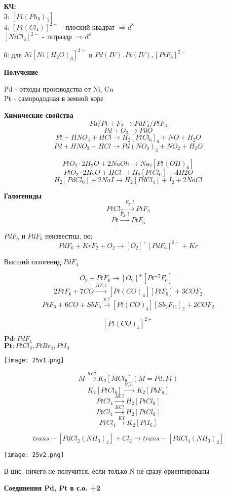 \textbf{КЧ:}\\
3: $[Pt(Ph_3)_3]$\\
4:  $[Pt(Cl_4)]^{2-}$ - плоский квадрат $\Rightarrow d^8$\\
$[NiCl_4]^{2-}$ - тетраэдр $\Rightarrow d^8$

6: для $Ni[Ni(H_2O)_6]^{2+}$ и $Pd(IV), Pt(IV), [PtF_6]^{2-}$

\textbf{Получение}

Pd - отходы производства от Ni, Cu\\
Pt - саморододная в земной коре

\textbf{Химические свойства}\\
$$Pd/Pt + F_2 \rightarrow PdF_4 / PtF_6$$
$$Pd + O_2 \rightarrow PdO$$
$$Pt + HNO_3 + HCl \rightarrow H_2[PtCl_6]_6 + NO + H_2O$$
$$Pd + HNO_3 + HCl \rightarrow Pd(NO_3)_3 + NO_2 + H_2O$$

$$PtO_2\cdot 2H_2O + 2NaOh \rightarrow Na_2[Pt(OH)_6]$$
$$PtO_2\cdot 2H_2O  + HCl \rightarrow H_2[PtCl_6] + 4H2O$$
$$H_2[PdCl_6] + 2NaI \rightarrow H_2[PdCl_4] + I_2 + 2NaCl$$

\textbf{Галогениды}
$$PtCl_2 \xrightarrow{F_2, t} PtF_5$$
$$Pt \xrightarrow{F_2,t} PtF_5$$

$PdF_6$ и $PdF_5$ неизвестны, но:
$$PdF_6 + KrF_2 + O_2 \rightarrow  [O_2]^+[PdF_6]^{2-} + Kr$$

Высший галогенид $PdF_4$

$$O_2 + PtF_6 \rightarrow [O_2]^+[Pt^{+5}F_6]^-$$
$$2PtF_6 + 7CO \xrightarrow{HF, t} [Pt(CO)_4][PtF_6] + 3COF_2$$
$$PtF_6 + 6CO + SbF_5  \xrightarrow{p,t} [Pt(CO)_4][Sb_2F_{11}]_2 + 2COF_2$$

$$[Pt(CO)_4]^{2+}$$


$\textbf{Pd} : PdF_4$\\
$\textbf{Pt} : PtCl_4, PtBr_4, PtI_4$

\texttt{[image: 25v1.png]}

$$M \xrightarrow{KCl} K_2[MCl_6] (M = Pd, Pt)$$
$$K_2[PtCl_6] \xrightarrow{B_2F_3} K_2[PbF_6]$$
$$PtCl_4 \xrightarrow{HCl} H_2[PtCl_6]$$
$$PtCl_4 \xrightarrow{KCl} H_2[PtCl_6]$$
$$PtCl_4 \xrightarrow{KI} K_2[PtI_6]$$

$$trans-[PdCl_2(NH_3)_2] + Cl_2 \rightarrow trans-[PdCl_4(NH_3)_2]$$

\texttt{[image: 25v2.png]}

В цис- ничего не получится, если только N не сразу ориентированы

\textbf{Соединения Pd, Pt в с.о. +2}

